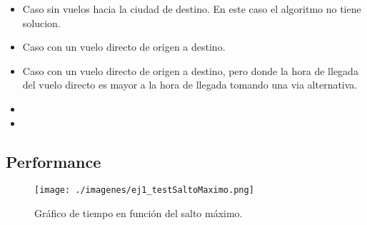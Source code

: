 \begin{itemize}

\item Caso sin vuelos hacia la ciudad de destino. En este caso el algoritmo no tiene solucion.
\item Caso con un vuelo directo de origen a destino.
\item Caso con un vuelo directo de origen a destino, pero donde la hora de llegada del vuelo directo es mayor a la hora de llegada tomando una via alternativa.
\item 
\item 

\end{itemize}


\subsection{Performance}



\begin{figure}[H]
\begin{center}
\texttt{[image: ./imagenes/ej1\_testSaltoMaximo.png]}
\caption{Gr\'afico de tiempo en funci\'on del salto m\'aximo.}
\end{center}
\end{figure}


